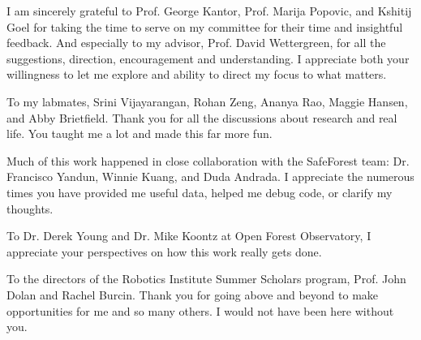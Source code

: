 
\setlength{\parskip}{1em}
\setlength{\parindent}{0em}

\noindent
I am sincerely grateful to Prof. George Kantor, Prof. Marija Popovic, and Kshitij Goel for taking the time to serve on my committee for their time and insightful feedback. And especially to my advisor, Prof. David Wettergreen, for all the suggestions, direction, encouragement and understanding. I appreciate both your willingness to let me explore and ability to direct my focus to what matters.

To my labmates, Srini Vijayarangan, Rohan Zeng, Ananya Rao, Maggie Hansen, and Abby Brietfield. Thank you for all the discussions about research and real life. You taught me a lot and made this far more fun.

Much of this work happened in close collaboration with the SafeForest team: Dr. Francisco Yandun, Winnie Kuang, and Duda Andrada. I appreciate the numerous times you have provided me useful data, helped me debug code, or clarify my thoughts. 


To Dr. Derek Young and Dr. Mike Koontz at Open Forest Observatory, I appreciate your perspectives on how this work really gets done. 

To the directors of the Robotics Institute Summer Scholars program, Prof. John Dolan and Rachel Burcin. Thank you for going above and beyond to make opportunities for me and so many others. I would not have been here without you.
